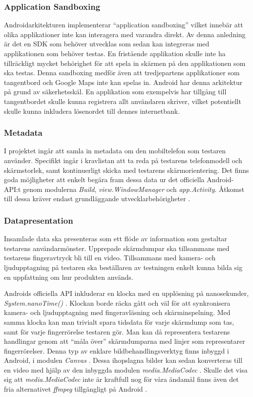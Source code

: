 \subsubsection{Application Sandboxing}
Androidarkitekturen implementerar ``application sandboxing'' vilket innebär att olika applikationer inte kan interagera med varandra direkt.\parencite{sandbox} Av denna anledning är det en SDK som behöver utvecklas som sedan kan integreras med applikationen som behöver testas. En fristående applikation skulle inte ha tillräckligt mycket behörighet för att spela in skärmen på den applikationen som ska testas. Denna sandboxing medför även att tredjepartens applikationer som tangentbord och Google Maps inte kan spelas in. 
Android har denna arkitektur på grund av säkerhetsskäl. En applikation som exempelvis har tillgång till tangentbordet skulle kunna registrera allt användaren skriver, vilket potentiellt skulle kunna inkludera lösenordet till dennes internetbank. 

\subsubsection{Metadata}
\label{subsubsec:Metadata}
I projektet ingår att samla in metadata om den mobiltelefon som testaren använder. Specifikt ingår i kravlistan att ta reda på testarens telefonmodell och skärmstorlek, samt kontinuerligt skicka med testarens skärmorientering. Det finns goda möjligheter att enkelt begära fram dessa data ur det officiella Android-API:t genom modulerna \textit{Build}, \textit{view.WindowManager} och \textit{app.Activity}. Åtkomst till dessa kräver endast grundläggande utvecklarbehörigheter \parencite{adoc}.

\subsubsection{Datapresentation}
\label{subsubsec:Datapresentation}
Insamlade data ska presenteras som ett flöde av information som gestaltar testarens användarmönster. Upprepade skärmdumpar ska tillsammans med testarens fingeravtryck bli till en video. Tillsammans med kamera- och ljudupptagning på testaren ska beställaren av testningen enkelt kunna bilda sig en uppfattning om hur produkten används.

Androids officiella API inkluderar en klocka med en upplösning på nanosekunder, \textit{System.nanoTime()} \parencite{adoc}. Klockan borde räcka gått och väl för att synkronisera kamera- och ljudupptagning med fingeravläsning och skärminspelning. Med samma klocka kan man trivialt spara tidsdata för varje skärmdump som tas, samt för varje fingerrörelse testaren gör. Man kan då representera testarens handlingar genom att ``måla över'' skärmdumparna med linjer som representarer fingerrörelser. Denna typ av enklare bildbehandlingsverktyg finns inbyggd i Android, i modulen \textit{Canvas} \parencite{adoc}. Dessa ihopslagna bilder kan sedan konverteras till en video med hjälp av den inbyggda modulen \textit{media.MediaCodec} \parencite{adoc}. Skulle det visa sig att \textit{media.MediaCodec} inte är kraftfull nog för våra ändamål finns även det fria alternativet \textit{ffmpeg} tillgängligt på Android \parencite{roman10}.

